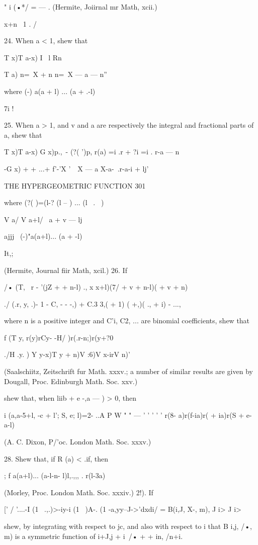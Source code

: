 " i (•*/ = — . (Hermite, Joiirnal mr Math, xcii.)

x+n \ 1 . /

24. When a < 1, shew that

T x)T a-x) I \ l Rn

T a) n=\ X + n n=\ X — a — n''

where (-) a(a + l) ... (a + .-l)

7i !

25. When a > 1, and v and a are respectively the integral and
fractional parts of a, shew that

T x)T a-x) G x)p.,\ - (?( ')p, r(a) =i .r + ?i =i . r-a — n

-G x) + + ...+ f'-'X '\ \ X — a X-a-\ .r-a-i + lj'

THE HYPERGEOMETRIC FUNCTION 301

where (?( )=(l-? (l -- ) ... (l \ . \ )

V a/ V a+l/ \ a + v — lj

ajjj \ (-)"a(a+l)... (a + -l)

It,;

(Hermite, Journal fiir Math, xcil.) 26. If

/• (T, \ r - '(jZ + + n-l) ., x x+l)(7/ + v + n-l)( + v + n)

./ (.r, y, .)- 1 - C, - - -,) + C.3 3,( + 1) ( +,)( ., + i) - ...,

where n is a positive integer and C'i, C2, ... are binomial
coefficients, shew that

f (T y, r(y)rCy- -H/ )r(.r-n;)r(y+?0

./H .y. ) Y y-x)T y + n)V :6)V x-irV n)'

(Saalschiitz, Zeitschrift fur Math. xxxv.; a number of similar
results are given by Dougall, Proc. Edinburgh Math. Soc. xxv.)

shew that, when liib + e -,a — ) > 0, then

i (a,a-5+l, -c + l'; S, e; l)=2- ..A P W " " — ' ' ' ' ' r(8-
a)r(f-ia)r( + ia)r(S + e-a-l)

(A. C. Dixon, P/'oc. London Math. Soc. xxxv.)

28. Shew that, if R (a) < .if, then

; f a(a+l)... (a-l-n- l)l,.,,, . r(l-3a)

(Morley, Proc. London Math. Soc. xxxiv.) 2!). If

[' / '....-I (1 \ .,.)>-iy-i (1 \ )A-. (1 -a,yy--J->'dxdi/ = B(i,J,
X-, m), J i> J i>

shew, by integrating with respect to jc, and also with respect to i
that B i,j, /•, m) is a symmetric function of i+J,j + i\ /• + + in,
/n+i.

